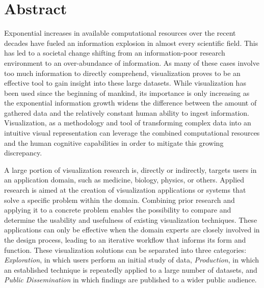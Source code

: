 \chapter*{Abstract}

Exponential increases in available computational resources over the recent decades have fueled an information explosion in almost every scientific field.  This has led to a societal change shifting from an information-poor research environment to an over-abundance of information.  As many of these cases involve too much information to directly comprehend, visualization proves to be an effective tool to gain insight into these large datasets.  While visualization has been used since the beginning of mankind, its importance is only increasing as the exponential information growth widens the difference between the amount of gathered data and the relatively constant human ability to ingest information.  Visualization, as a methodology and tool of transforming complex data into an intuitive visual representation can leverage the combined computational resources and the human cognitive capabilities in order to mitigate this growing discrepancy.

A large portion of visualization research is, directly or indirectly, targets users in an application domain, such as medicine, biology, physics, or others.  Applied research is aimed at the creation of visualization applications or systems that solve a specific problem within the domain.  Combining prior research and applying it to a concrete problem enables the possibility to compare and determine the usability and usefulness of existing visualization techniques.  These applications can only be effective when the domain experts are closely involved in the design process, leading to an iterative workflow that informs its form and function.  These visualization solutions can be separated into three categories:  \emph{Exploration}, in which users perform an initial study of data, \emph{Production}, in which an established technique is repeatedly applied to a large number of datasets, and \emph{Public Dissemination} in which findings are published to a wider public audience.

